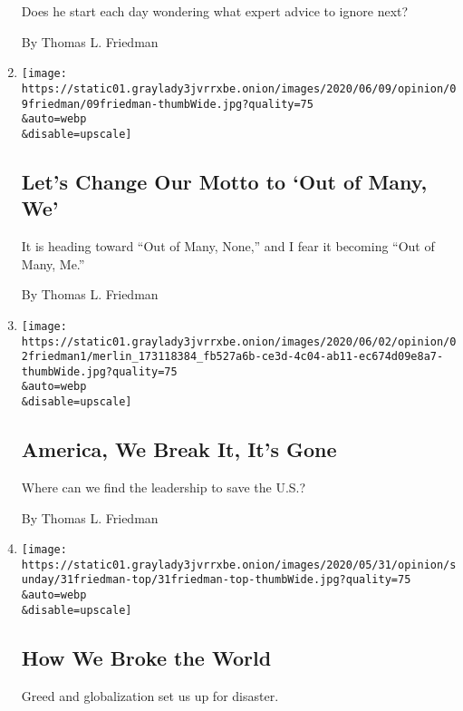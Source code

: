 \begin{enumerate}
  Does he start each day wondering what expert advice to ignore next?

  By Thomas L. Friedman
\item
  \href{/2020/06/09/opinion/trump-united-states.html}{}

  \texttt{[image: https://static01.graylady3jvrrxbe.onion/images/2020/06/09/opinion/09friedman/09friedman-thumbWide.jpg?quality=75\\\&auto=webp\\\&disable=upscale]}

  \hypertarget{lets-change-our-motto-to-out-of-many-we}{%
  \subsection{Let's Change Our Motto to `Out of Many,
  We'}\label{lets-change-our-motto-to-out-of-many-we}}

  It is heading toward ``Out of Many, None,'' and I fear it becoming
  ``Out of Many, Me.''

  By Thomas L. Friedman
\item
  \href{/2020/06/02/opinion/trump-george-floyd-america.html}{}

  \texttt{[image: https://static01.graylady3jvrrxbe.onion/images/2020/06/02/opinion/02friedman1/merlin\_173118384\_fb527a6b-ce3d-4c04-ab11-ec674d09e8a7-thumbWide.jpg?quality=75\\\&auto=webp\\\&disable=upscale]}

  \hypertarget{america-we-break-it-its-gone}{%
  \subsection{America, We Break It, It's
  Gone}\label{america-we-break-it-its-gone}}

  Where can we find the leadership to save the U.S.?

  By Thomas L. Friedman
\item
  \href{/2020/05/30/opinion/sunday/coronavirus-globalization.html}{}

  \texttt{[image: https://static01.graylady3jvrrxbe.onion/images/2020/05/31/opinion/sunday/31friedman-top/31friedman-top-thumbWide.jpg?quality=75\\\&auto=webp\\\&disable=upscale]}

  \hypertarget{how-we-broke-the-world}{%
  \subsection{How We Broke the World}\label{how-we-broke-the-world}}

  Greed and globalization set us up for disaster.


\end{enumerate}
